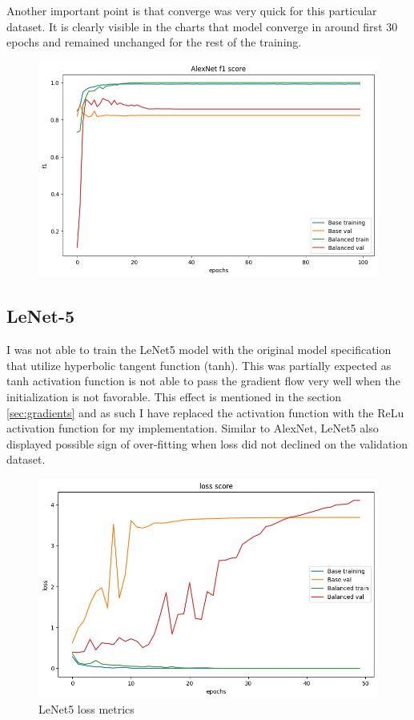 Another important point is that converge was very quick for this particular dataset. 
It is clearly visible in the charts that model converge in around first 30 epochs and remained unchanged for the rest of the training.

\begin{figure}[H]
    \centering
    \includegraphics[width=.9\textwidth]{img/alexnetf1.png}
    \caption{}
    \label{fig:alexf1}
\end{figure}


\subsection{LeNet-5}
I was not able to train the LeNet5 model with the original model specification that utilize hyperbolic tangent function (tanh).
This was partially expected as tanh activation function is not able to pass the gradient flow very well when the initialization is not favorable.
This effect is mentioned in the section \ref{sec:gradients} and as such I have replaced the activation function with the ReLu activation function for my implementation.
Similar to AlexNet, LeNet5 also displayed possible sign of over-fitting when loss did not declined on the validation dataset.

\begin{figure}[H]
    \centering
    \includegraphics[width=.8\textwidth]{img/lenetloss.png}
    \caption{LeNet5 loss metrics}
    \label{fig:lenetloss}
\end{figure}

